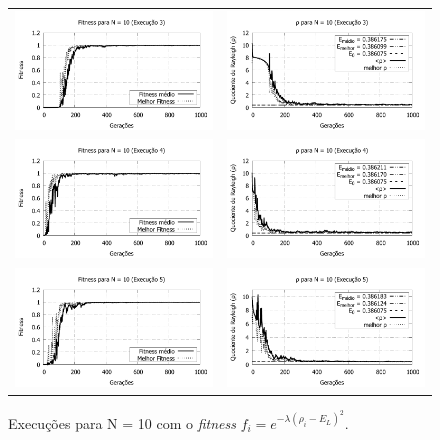 \begin{figure}[phtb]
\begin{tabular}{@{}cc@{}}
		\includegraphics[width=.40\textwidth]{figs/resultados/fitnessEL/N-10_E-3_fitness-extendido.pdf} &
    \includegraphics[width=.40\textwidth]{figs/resultados/fitnessEL/N-10_E-3_rho_extendido.pdf}   \\
		\includegraphics[width=.40\textwidth]{figs/resultados/fitnessEL/N-10_E-4_fitness-extendido.pdf} &
    \includegraphics[width=.40\textwidth]{figs/resultados/fitnessEL/N-10_E-4_rho_extendido.pdf} \\
		\includegraphics[width=.40\textwidth]{figs/resultados/fitnessEL/N-10_E-5_fitness-extendido.pdf} &
    \includegraphics[width=.40\textwidth]{figs/resultados/fitnessEL/N-10_E-5_rho_extendido.pdf}
  \end{tabular}
  \caption{Execuções para N = 10 com o \textit{fitness} $f_i = e^{-\lambda(\rho_i - E_L)^2}$.}
	\label{fig:execucoes_N10_EL}
	\end{figure}
	
